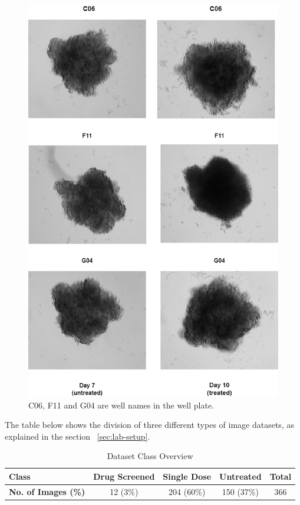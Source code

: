 \begin{figure}[H]
  \centering
  \includegraphics[scale=0.46]{figures/transition.png} 
  \caption{C06, F11 and G04 are well names in the well plate.}
  \label{fig:Transition}
\end{figure}



The table below shows the division of three different types of image datasets, as  explained in the section ~\ref{sec:lab-setup}.
\begin{table}[ht!]
  \centering
  \begin{tabular}{|l|c|c|c|c|}
  \hline
  \textbf{Class} & \textbf{Drug Screened} & \textbf{Single Dose} & \textbf{Untreated} & \textbf{Total} \\ \hline
  \textbf{No. of Images (\%)}  & 12 (3\%) & 204 (60\%) & 150 (37\%) & 366 \\ \hline
  \end{tabular}
  \caption{Dataset Class Overview}
  \label{tab:dataset}
\end{table}

